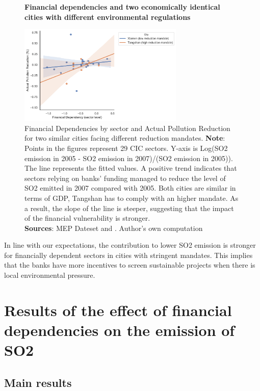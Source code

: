 \documentclass[12pt]{article}
\begin{document}
\begin{figure}[ht]
    \centering
    \textbf{Financial dependencies and two economically identical cities with different environmental regulations}\par\medskip
    \includegraphics[width=0.7\textwidth]{fig_4.jpg}
    \caption{Financial Dependencies by sector and Actual Pollution Reduction for two similar cities facing different reduction mandates.
    \textbf{Note}: Points in the figures represent 29 CIC sectors. Y-axis is Log(SO2 emission in 2005 - SO2 emission in 2007)/(SO2 emission in 2005)). The line represents the fitted values. A positive trend indicates that sectors relying on banks’ funding managed to reduce the level of SO2 emitted in 2007 compared with 2005. Both cities are similar in terms of GDP, Tangshan has to comply with an higher mandate. As a result, the slope of the line is steeper, suggesting that the impact of the financial vulnerability is stronger.\\
    \textbf{Sources}: MEP Dateset and \cite{Fan2015-bm}. Author's own computation
    }
    \label{fig:figure4}
\end{figure}

In line with our expectations, the contribution to lower SO2 emission is stronger for financially dependent sectors in cities with stringent mandates. This implies that the banks have more incentives to screen sustainable projects when there is local environmental pressure.

\section{Results of the effect of financial dependencies on the emission of SO2} \label{sec:result}

\subsection{Main results}
\end{document}
